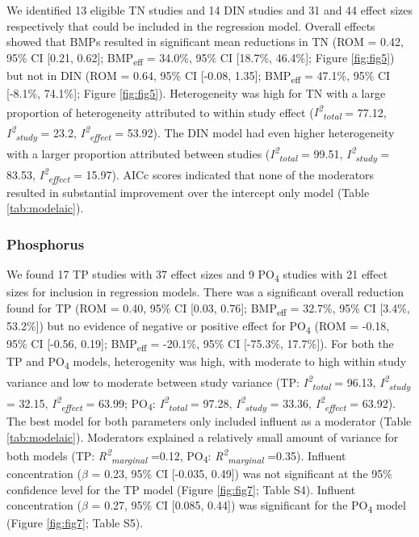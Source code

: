 \documentclass[utf8]{FrontiersinHarvard}
\begin{document}
We identified 13 eligible TN studies and 14 DIN studies and 31 and 44 effect sizes respectively that could be included in the regression model.
Overall effects showed that BMPs resulted in significant mean reductions in TN (ROM = 0.42, 95\% CI {[}0.21, 0.62{]}; BMP\textsubscript{eff} = 34.0\%, 95\% CI {[}18.7\%, 46.4\%{]}; Figure \ref{fig:fig5}) but not in DIN (ROM = 0.64, 95\% CI {[}-0.08, 1.35{]}; BMP\textsubscript{eff} = 47.1\%, 95\% CI {[}-8.1\%, 74.1\%{]}; Figure \ref{fig:fig5}).
Heterogeneity was high for TN with a large proportion of heterogeneity attributed to within study effect (\textit{I\textsuperscript{2}\textsubscript{total}} = 77.12, \textit{I\textsuperscript{2}\textsubscript{study}} = 23.2, \textit{I\textsuperscript{2}\textsubscript{effect}} = 53.92).
The DIN model had even higher heterogeneity with a larger proportion attributed between studies (\textit{I\textsuperscript{2}\textsubscript{total}} = 99.51, \textit{I\textsuperscript{2}\textsubscript{study}} = 83.53, \textit{I\textsuperscript{2}\textsubscript{effect}} = 15.97).
AICc scores indicated that none of the moderators resulted in substantial improvement over the intercept only model (Table \ref{tab:modelaic}).

\hypertarget{phosphorus}{%
\subsubsection{Phosphorus}\label{phosphorus}}

We found 17 TP studies with 37 effect sizes and 9 PO\textsubscript{4} studies with 21 effect sizes for inclusion in regression models.
There was a significant overall reduction found for TP (ROM = 0.40, 95\% CI {[}0.03, 0.76{]}; BMP\textsubscript{eff} = 32.7\%, 95\% CI {[}3.4\%, 53.2\%{]}) but no evidence of negative or positive effect for PO\textsubscript{4} (ROM = -0.18, 95\% CI {[}-0.56, 0.19{]}; BMP\textsubscript{eff} = -20.1\%, 95\% CI {[}-75.3\%, 17.7\%{]}).
For both the TP and PO\textsubscript{4} models, heterogenity was high, with moderate to high within study variance and low to moderate between study variance (TP: \textit{I\textsuperscript{2}\textsubscript{total}} = 96.13, \textit{I\textsuperscript{2}\textsubscript{study}} = 32.15, \textit{I\textsuperscript{2}\textsubscript{effect}} = 63.99; PO\textsubscript{4}: \textit{I\textsuperscript{2}\textsubscript{total}} = 97.28, \textit{I\textsuperscript{2}\textsubscript{study}} = 33.36, \textit{I\textsuperscript{2}\textsubscript{effect}} = 63.92).
The best model for both parameters only included influent as a moderator (Table \ref{tab:modelaic}).
Moderators explained a relatively small amount of variance for both models (TP: \textit{R\textsuperscript{2}\textsubscript{marginal}} =0.12, PO\textsubscript{4}: \textit{R\textsuperscript{2}\textsubscript{marginal}} =0.35).
Influent concentration (\(\beta\) = 0.23, 95\% CI {[}-0.035, 0.49{]}) was not significant at the 95\% confidence level for the TP model (Figure \ref{fig:fig7}; Table S4).
Influent concentration (\(\beta\) = 0.27, 95\% CI {[}0.085, 0.44{]}) was significant for the PO\textsubscript{4} model (Figure \ref{fig:fig7}; Table S5).
\end{document}
